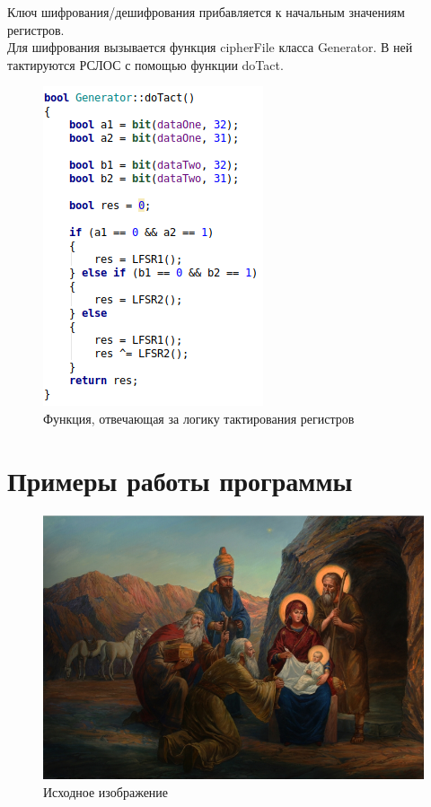 \documentclass{article}
\begin{document}
Ключ шифрования/дешифрования прибавляется к начальным значениям регистров. \\

Для шифрования вызывается функция cipherFile класса Generator. В ней тактируются РСЛОС с помощью функции doTact.
\begin{figure}[H]
    \begin{flushleft} \centerline{\includegraphics[scale=0.7]{dotact.png}}
        \caption{Функция, отвечающая за логику тактирования регистров}
    \end{flushleft}
\end{figure}

\section{Примеры работы программы}

\begin{figure}[H]
    \begin{flushleft} \centerline{\includegraphics[scale=0.5]{openimage.png}}
        \caption{Исходное изображение}
    \end{flushleft}
\end{figure}
\end{document}
